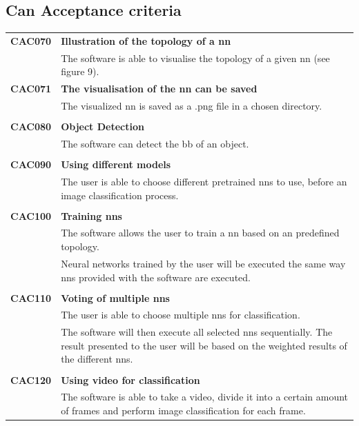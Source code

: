 \documentclass[parskip=full]{scrartcl}
\begin{document}
\subsection{Can Acceptance criteria}
\begin{tabular}{p{2cm}p{11.4cm}}
\textbf{CAC070} \hypertarget{CAC070} & \textbf{Illustration of the topology of a \gls{nn}} \\
& The software is able to visualise the topology of a given \gls{nn} (see figure 9). \\
\textbf{CAC071} \hypertarget{CAC071} & \textbf{The visualisation of the \gls{nn} can be saved}\\
& The visualized \gls{nn} is saved as a .png file in a chosen directory.\\
& \\
\textbf{CAC080} \hypertarget{CAC080} & \textbf{Object Detection} \\
& The software can detect the \gls{bb} of an object. \\ 
& \\
\textbf{CAC090} \hypertarget{CAC090} &  \textbf{Using different models}\\
& The user is able to choose different pretrained \glspl{nn} to use, before an \gls{image classification} process. \\
& \\
\textbf{CAC100} \hypertarget{CAC100} & \textbf{Training \glspl{nn}} \\
& The software allows the user to train a \gls{nn} based on an predefined topology.\\
& Neural networks trained by the user will be executed the same way \glspl{nn} provided with the software are executed.\\
& \\
\textbf{CAC110} \hypertarget{CAC110} & \textbf{Voting of multiple \glspl{nn}} \\
& The user is able to choose multiple \glspl{nn} for classification.\\
& The software will then execute all selected \glspl{nn} sequentially. The result presented to the user will be based on the weighted results of the different \glspl{nn}.\\
& \\
\textbf{CAC120} \hypertarget{CAC120} & \textbf{Using video for classification} \\
& The software is able to take a video, divide it into a certain amount of frames and perform \gls{image classification} for each frame.\\

\end{tabular}
\end{document}

